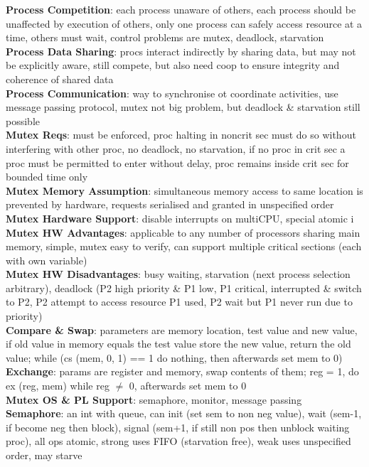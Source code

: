 \documentclass[a4paper]{article}
\begin{document}
\begin{multicols}{2}
        \textbf{Process Competition}: each process unaware of others, each process should be unaffected by execution of others, only one process can safely access resource at a time, others must wait, control problems are mutex, deadlock, starvation\\
        \textbf{Process Data Sharing}: procs interact indirectly by sharing data, but may not be explicitly aware, still compete, but also need coop to ensure integrity and coherence of shared data\\
        \textbf{Process Communication}: way to synchronise ot coordinate activities, use message passing protocol, mutex not big problem, but deadlock \& starvation still possible\\
        \textbf{Mutex Reqs}: must be enforced, proc halting in noncrit sec must do so without interfering with other proc, no deadlock, no starvation, if no proc in crit sec a proc must be permitted to enter without delay, proc remains inside crit sec for bounded time only\\
        \textbf{Mutex Memory Assumption}: simultaneous memory access to same location is prevented by hardware, requests serialised and granted in unspecified order\\
        \textbf{Mutex Hardware Support}: disable interrupts on multiCPU, special atomic i\\
        \textbf{Mutex HW Advantages}: applicable to any number of processors sharing main memory, simple, mutex easy to verify, can support multiple critical sections (each with own variable)\\
        \textbf{Mutex HW Disadvantages}: busy waiting, starvation (next process selection arbitrary), deadlock (P2 high priority \& P1 low, P1 critical, interrupted \& switch to P2, P2 attempt to access resource P1 used, P2 wait but P1 never run due to priority)\\
        \textbf{Compare \& Swap}: parameters are memory location, test value and new value, if old value in memory equals the test value store the new value, return the old value; while (cs (mem, 0, 1) == 1 do nothing, then afterwards set mem to 0)\\
        \textbf{Exchange}: params are register and memory, swap contents of them; reg = 1, do ex (reg, mem) while reg $\neq$ 0, afterwards set mem to 0\\
        \textbf{Mutex OS \& PL Support}: semaphore, monitor, message passing\\
        \textbf{Semaphore}: an int with queue, can init (set sem to non neg value), wait (sem-1, if become neg then block), signal (sem+1, if still non pos then unblock waiting proc), all ops atomic, strong uses FIFO (starvation free), weak uses unspecified order, may starve\\

\end{multicols}
\end{document}
